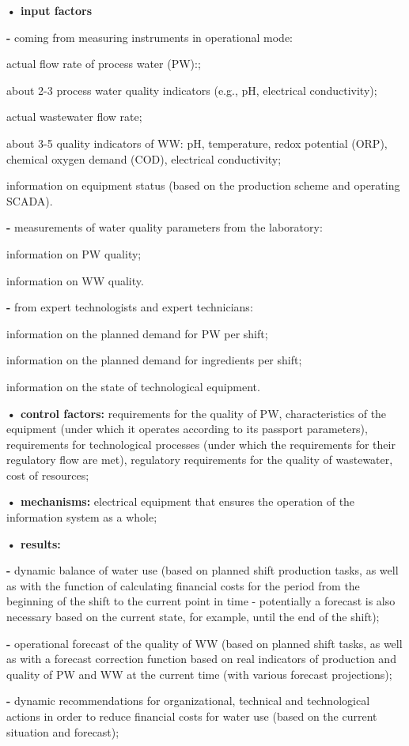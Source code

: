 \documentclass[a4paper, 10pt,twocolumn]{article}
\begin{document}
\textbf{• input factors}
\par \quad  \textbf{-} coming from measuring instruments in operational mode:
\par \qquad \textasteriskcentered \quad  actual flow rate of process water (PW):;
\par \qquad \textasteriskcentered \quad  about 2-3 process water quality indicators
(e.g., pH, electrical conductivity);
\par \qquad \textasteriskcentered \quad  actual wastewater flow rate;
\par \qquad \textasteriskcentered \quad  about 3-5 quality indicators of WW: pH, temperature, redox potential (ORP), chemical oxygen demand (COD), electrical conductivity;
\par \qquad \textasteriskcentered \quad  information on equipment status (based on the
production scheme and operating SCADA).
\par \quad  \textbf{-} measurements of water quality parameters from
the laboratory:
\par \qquad \textasteriskcentered \quad information on PW quality;
\par \qquad \textasteriskcentered \quad information on WW quality.

\par \quad  \textbf{-} from expert technologists and expert technicians:
\par \qquad \textasteriskcentered \quad information on the planned demand for PW
per shift;
\par \qquad \textasteriskcentered \quad information on the planned demand for ingredients per shift;
\par \qquad \textasteriskcentered \quad information on the state of technological
equipment.
\par \textbf{• control factors:}  requirements for the quality of PW,
characteristics of the equipment (under which it
operates according to its passport parameters), requirements for technological processes (under which
the requirements for their regulatory flow are met),
regulatory requirements for the quality of wastewater, cost of resources;
\par \textbf{• mechanisms:} electrical equipment that ensures the
operation of the information system as a whole;
\par \textbf{• results:}
\par \quad  \textbf{-} dynamic balance of water use (based on planned
shift production tasks, as well as with the function
of calculating financial costs for the period from
the beginning of the shift to the current point
in time - potentially a forecast is also necessary
based on the current state, for example, until the
end of the shift);
\par \quad  \textbf{-} operational forecast of the quality of WW (based
on planned shift tasks, as well as with a forecast
correction function based on real indicators of
production and quality of PW and WW at the
current time (with various forecast projections);
\par \quad  \textbf{-} dynamic recommendations for organizational,
technical and technological actions in order to
reduce financial costs for water use (based on the
current situation and forecast);
\end{document}
